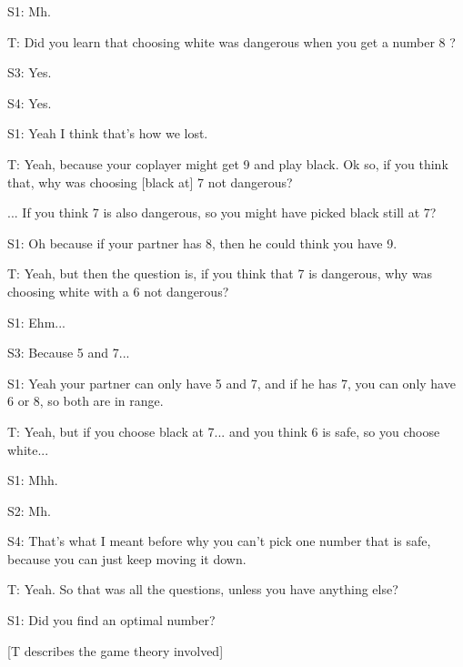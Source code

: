 \documentclass[a4paper,superscriptaddress,nofootinbib]{revtex4}
\begin{document}
S1: Mh.

T: Did you learn that choosing white was dangerous when you get a number 8 ?

S3: Yes.

S4: Yes.

S1: Yeah I think that's how we lost.

T: Yeah, because your coplayer might get 9 and play black. Ok so, if you think that, why was choosing [black at] 7 not dangerous? 

... If you think 7 is also dangerous, so you might have picked black still at 7?

S1: Oh because if your partner has 8, then he could think you have 9.

T: Yeah, but then the question is, if you think that 7 is dangerous, why was choosing white with a 6 not dangerous?

S1: Ehm...

S3: Because 5 and 7...

S1: Yeah your partner can only have 5 and 7, and if he has 7, you can only have 6 or 8, so both are in range.

T: Yeah, but if you choose black at 7... and you think 6 is safe, so you choose white...

S1: Mhh.

S2: Mh.

S4: That's what I meant before why you can't pick one number that is safe, because you can just keep moving it down.

T: Yeah. So that was all the questions, unless you have anything else?

S1: Did you find an optimal number?

[T describes the game theory involved]
 
\end{document}
